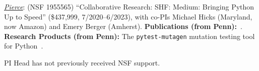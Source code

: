 


\emph{\underline{Pierce}}: (NSF 1955565) ``Collaborative Research:
SHF: Medium: Bringing Python Up to Speed'' (\$437,999, 7/2020--6/2023), with co-PIs Michael Hicks (Maryland, now Amazon) and Emery
Berger (Amherst).
{\bf Publications (from Penn):}~\cite{DBLP:conf/esop/GoldsteinHLP21,
  GoldsteinChoices2022, GoldsteinOOPSLA2022}.
{\bf Research Products (from Penn):} The {\tt pytest-mutagen} mutation
testing tool for Python~\cite{pytestmutagen}.

PI Head has not previously received NSF support.

